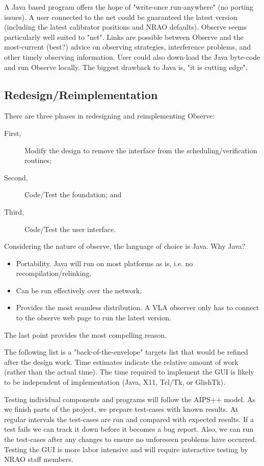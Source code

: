 A Java based program offers the hope of "write-once run-anywhere" (no
porting issues).  A user
connected to the net could be guaranteed the latest version (including the
latest calibrator positions and NRAO defaults). 
Observe seems particularly well suited to "net".  Links are possible between
Observe and
the most-current (best?) advice on observing strategies, interference problems,
and other timely observing information.  User could also down-load the Java
byte-code and run Observe locally.
The biggest drawback to Java is, "it is cutting edge".

\subsection{Redesign/Reimplementation}

There are three phases in redesigning and reimplementing Observe:
\begin{description}
\item[First,] Modify the design to remove the interface from the
           scheduling/verification routines;
\item[Second,] Code/Test the foundation; and
\item[Third,] Code/Test the user interface.
\end{description}

Considering the nature of observe, the language of choice is Java.  Why Java?
\begin{itemize}
\item Portability.  Java will run on most platforms as is, i.e. no
recompilation/relinking.
\item Can be run effectively over the network.
\item Provides the most seamless distribution. A VLA observer only has to
connect to the observe web page to run the latest version.
\end{itemize}
The last point provides the most compelling reason.

The following list is a "back-of-the-envelope" targets
list that would be refined after the design work.  Time estimates indicate
the relative amount of work (rather than the actual time).  The time required
to implement the GUI is likely to be independent of implementation (Java, X11,
Tcl/Tk, or GlishTk).

Testing individual components and programs will follow the AIPS++
model.  As we finish parts of the project, we prepare test-cases with
known results. At
regular intervals the test-cases are run and compared with expected results.
If a test fails we can track it down before it becomes a bug report.
Also, we can run the test-cases after any changes to ensure no unforeseen
problems have occurred.  Testing the GUI is more labor intensive and will
require interactive testing by NRAO staff members.


